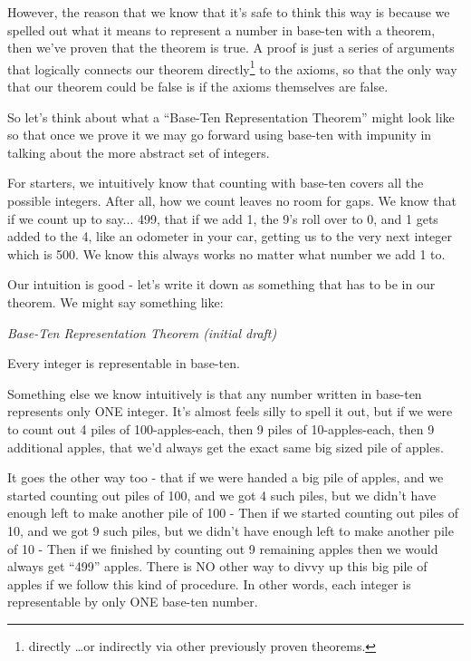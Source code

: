 \documentclass{article}
\newenvironment{jprIn}{\begin{adjustwidth}{2em}{}}{\end{adjustwidth}}
\begin{document}
However, the reason that we know that it's safe to think this way is because we 
spelled out what it means to represent a number in base-ten with 
a theorem, then we've proven that the theorem is true.
A proof
is just a series of arguments that logically connects our theorem directly\footnote{directly \dots{}or indirectly
via other previously proven theorems.} to the axioms, so that the only way
that our theorem could be false is if the axioms themselves are false.

So let's think about what a ``Base-Ten Representation Theorem'' might look like
so that once we prove it we may go forward using base-ten with impunity in talking about the more abstract set of integers.

For starters, we intuitively know that counting with base-ten covers all the possible integers.
After all, how we count leaves no room for gaps.  We know that if we count up to say... 499,
that if we add 1, the 9's roll over to 0, and 1 gets added to the 4, like an odometer in your car,
getting us to the very next integer which is 500.  We know this always works no matter what number we add 1 to.

Our intuition is good - let's write it down as something that has to be
in our theorem. We might say something like:

\emph{Base-Ten Representation Theorem (initial draft)}
\begin{jprIn}
Every integer is representable in base-ten.
\end{jprIn}
 
Something else we know intuitively is that any number written
in base-ten represents only ONE integer. It's almost feels silly to spell it out, but if we were to count out
4 piles of 100-apples-each, then 9 piles of 10-apples-each, then 9 additional apples, that
we'd always get the exact same big sized pile of apples.

It goes the other way too - that if we were handed a big pile of apples, and we started counting out
piles of 100, and we got 4 such piles, but we didn't have enough left to make another pile of 100 -
Then if we started counting out
piles of 10, and we got 9 such piles, but we didn't have enough left to make another pile of 10 -
Then if we finished by counting out 9 remaining apples
then we would always get ``499'' apples. There is NO other way to divvy up this big pile of apples
if we follow this kind of procedure.  In other words, each integer is representable by only ONE base-ten number.
\end{document}

